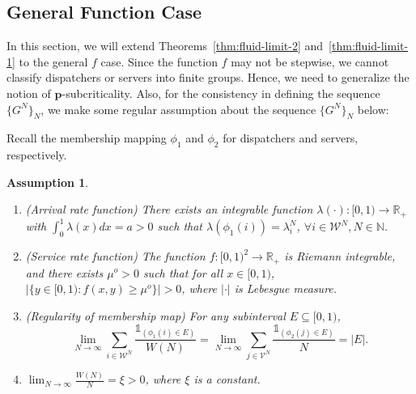 \documentclass[11pt, reqno]{article}
\newtheorem{assumption}[theorem]{Assumption}
\numberwithin{equation}{section}
\numberwithin{theorem}{section}
\newcommand{\R}{\mathbb{R}}                 %
\newcommand{\N}{\mathbb{N}}                 %
\begin{document}
\subsection{General Function Case}\label{sec:general-case}
In this section, we will
extend Theorems~\ref{thm:fluid-limit-2} and~\ref{thm:fluid-limit-1} to the general $f$ case. Since the function $f$ may not be stepwise, we cannot classify dispatchers or servers into finite groups. 
Hence, we need to generalize the notion of $\mathbf{p}$-subcriticality. 
Also, for the consistency in defining the sequence $\{G^N\}_N$, we make some regular assumption about the sequence $\{G^N\}_N$ below:

Recall the membership mapping $\phi_1$ and $\phi_2$ for dispatchers and servers, respectively.
\begin{assumption}\label{ass:f-sequence}
    \begin{enumerate}[\normalfont(i)]
        \item (Arrival rate function) There exists an integrable function $\lambda(\cdot):[0,1)\rightarrow\R_+$ with $\int_0^1 \lambda(x)dx=a>0$ such that %
        $\lambda(\phi_1(i))=\lambda^N_i$, $\forall i\in\mathcal{W}^N, N\in\N$.
        \item (Service rate function) The function $f:[0,1)^2\rightarrow\R_+$ is Riemann integrable, and there exists $\mu^o>0$ such that for all $x\in[0,1)$, $|\{y\in[0,1):f(x,y)\geq \mu^o\}|>0$, where $|\cdot|$ is Lebesgue measure. 
        \item (Regularity of membership map) For any subinterval $E\subseteq [0,1)$, $$\lim_{N\rightarrow\infty}\sum_{i\in\mathcal{W}^N}\frac{\mathds{1}_{(\phi_1(i)\in E)}}{W(N)}= \lim_{N\rightarrow\infty}\sum_{j\in\mathcal{V}^N}\frac{\mathds{1}_{(\phi_2(j)\in E)}}{N} =|E|.$$ 
        \item $\lim_{N\rightarrow\infty}\frac{W(N)}{N}=\xi>0$, where $\xi$ is a constant.
    \end{enumerate}
\end{assumption}
\end{document}
